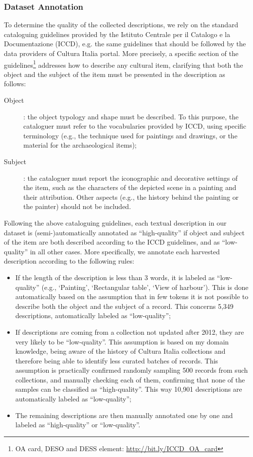 \documentclass[epsfig,a4paper,12pt,titlepage]{book}
\begin{document}
\subsubsection{Dataset Annotation}
\label{annotation_dataset}
To determine the quality of the collected descriptions, we rely on the standard cataloguing guidelines provided  by the Istituto Centrale per il Catalogo e la Documentazione (ICCD), e.g. the same guidelines that should be followed by the data providers of Cultura Italia portal. More precisely, a specific section of the guidelines\footnote{OA card, DESO and DESS element: {\url{http://bit.ly/ICCD_OA_card}}} addresses how to describe any cultural item, clarifying that both the object and the subject of the item must be presented in the description as follows:
\begin{description}
\item[Object]: the object typology and shape must be described. To this purpose, the cataloguer must refer to the vocabularies provided by ICCD, using specific terminology (e.g., the technique used for paintings and drawings, or the material for the archaeological items);
\item[Subject]: the cataloguer must report the iconographic and decorative settings of the item, such as the characters of the depicted scene in a painting and their attribution. Other aspects (e.g., the history behind the painting or the painter) should not be included. 
\end{description}
 Following the above cataloguing guidelines, each textual description in our dataset is (semi-)automa\-tically annotated  as ``high-quality'' if object and subject of the item are both described according to the ICCD guidelines, and as ``low-quality'' in all other cases. 
 More specifically, we annotate each harvested description according to the following rules:
 \begin{itemize}
     \item If the length of the description is less than 3 words,  it is labeled as ``low-quality'' (e.g., `Painting', `Rectangular table', `View of harbour'). This is done automatically based on the assumption that in few tokens it is not possible to describe both the object and the subject of a record. This concerns 5,349 descriptions, automatically labeled as ``low-quality'';
     \item If descriptions are coming from a collection not  updated after 2012, they are very likely to be ``low-quality''. This assumption is based on my domain knowledge, being aware of the history of Cultura Italia collections and therefore being able to identify less curated batches of records. This assumption is practically confirmed randomly sampling 500 records from such collections, and manually checking each of them,  confirming that none of the samples can be classified as ``high-quality''. This way 10,901 descriptions are automatically labeled as ``low-quality'';
     \item The remaining descriptions are then manually annotated one by one 
     and labeled as ``high-quality'' or ``low-quality''.

 \end{itemize}
 
\end{document}
